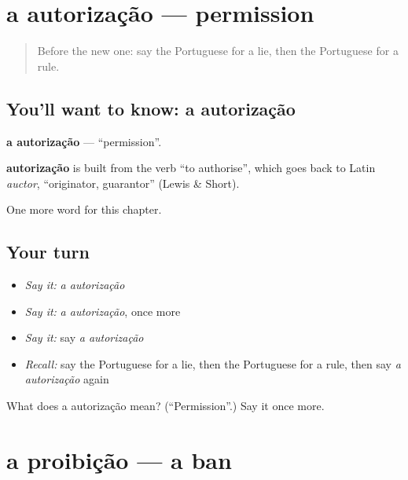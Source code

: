 \section[a autorização]{a autorização — permission}

\label{lesson:PT-C192-autorizacao}



\begin{quote}
Before the new one: say the Portuguese for a lie, then the Portuguese for a rule.
\end{quote}

\subsection*{You'll want to know: a autorização}
\textbf{a autorização} — \textquotedblleft{}permission\textquotedblright{}.

\begin{cousinweb}
\textbf{autorização} is built from the verb \textquotedblleft{}to authorise\textquotedblright{}, which goes back to Latin \emph{auctor}, \textquotedblleft{}originator, guarantor\textquotedblright{} (Lewis \& Short).
\end{cousinweb}

\begin{grammarlens}[title={What you've built}]
One more word for this chapter.
\end{grammarlens}

\subsection*{Your turn}
\begin{itemize}
\raggedright
  \item \emph{Say it:} \emph{a autorização}
  \item \emph{Say it:} \emph{a autorização}, once more
  \item \emph{Say it:} say \emph{a autorização}
  \item \emph{Recall:} say the Portuguese for a lie, then the Portuguese for a rule, then say \emph{a autorização} again
\end{itemize}

\begin{tcolorbox}[breakable,colback=teal!4,colframe=teal!35!black,title={Before you move on}]
What does a autorização mean? (\textquotedblleft{}Permission\textquotedblright{}.) Say it once more.
\end{tcolorbox}
\section[a proibição]{a proibição — a ban}

